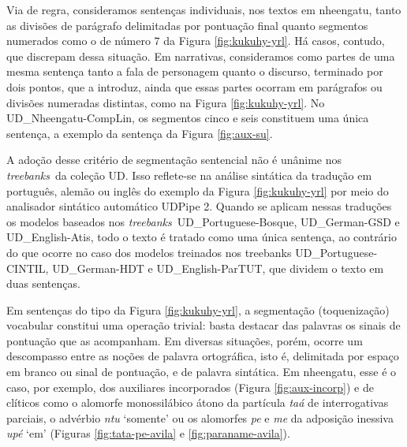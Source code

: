 \documentclass[portuguese]{textolivre}
\newcommand{\wt}[2]{\textit{#1} `#2'}
\newcommand{\tbc}{UD\_Nheengatu-CompLin}
\newcommand{\tbs}{\textit{treebanks}}
\begin{document}
Via de regra, consideramos sentenças individuais, nos textos em nheengatu, tanto as divisões de parágrafo delimitadas por pontuação final quanto segmentos numerados como o de número 7 da Figura \ref{fig:kukuhy-yrl}. Há casos, contudo, que discrepam dessa situação. Em narrativas, consideramos como partes de uma mesma sentença tanto a fala de personagem quanto o discurso, terminado por dois pontos, que a introduz, ainda que essas partes ocorram em parágrafos ou divisões numeradas distintas, como na Figura \ref{fig:kukuhy-yrl}. No \tbc, os segmentos cinco e seis constituem uma única sentença, a exemplo da sentença da Figura \ref{fig:aux-su}. 

A adoção desse critério de segmentação sentencial não é unânime nos \tbs~da coleção UD. Isso reflete-se na análise sintática da tradução em português, alemão ou inglês do exemplo da Figura \ref{fig:kukuhy-yrl} por meio do analisador sintático automático UDPipe 2. Quando se aplicam nessas traduções os modelos baseados nos \tbs~UD\_Portuguese-Bosque, UD\_German-GSD e UD\_English-Atis, todo o texto é tratado como uma única sentença, ao contrário do que ocorre no caso dos modelos treinados nos treebanks UD\_Portuguese-CINTIL, UD\_German-HDT e UD\_English-ParTUT, que dividem o texto em duas sentenças.

Em sentenças do tipo da Figura \ref{fig:kukuhy-yrl}, a segmentação (toquenização) vocabular constitui uma operação trivial: basta destacar das palavras os sinais de pontuação que as acompanham. Em diversas situações, porém, ocorre um descompasso entre as noções de palavra ortográfica, isto é, delimitada por espaço em branco ou sinal de pontuação, e de palavra sintática. Em nheengatu, esse é o caso, por exemplo, dos auxiliares incorporados (Figura \ref{fig:aux-incorp}) e de clíticos como o alomorfe monossilábico átono da partícula \textit{taá} de interrogativas parciais, o advérbio \wt{ntu}{somente} ou os alomorfes \textit{pe} e \textit{me} da adposição inessiva \wt{upé}{em} (Figuras \ref{fig:tata-pe-avila} e \ref{fig:paraname-avila}). 
\end{document}
